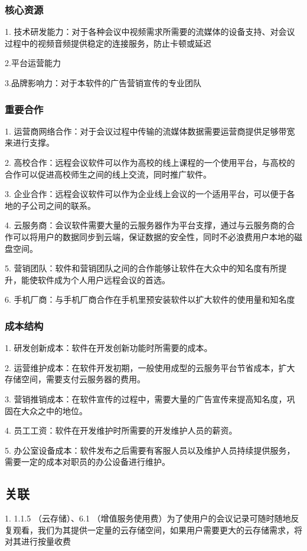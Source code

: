 \documentclass[a4paper,12pt]{article}
\begin{document}
    \subsubsection{核心资源}
    1. 技术研发能力：对于各种会议中视频需求所需要的流媒体的设备支持、对会议过程中的视频音频提供稳定的连接服务，防止卡顿或延迟

    2.平台运营能力

    3.品牌影响力：对于本软件的广告营销宣传的专业团队

    \subsubsection{重要合作}
    1. 运营商网络合作：对于会议过程中传输的流媒体数据需要运营商提供足够带宽来进行支撑。

    2. 高校合作：远程会议软件可以作为高校的线上课程的一个使用平台，与高校的合作可以促进高校师生之间的线上交流，同时推广软件。

    3. 企业合作：远程会议软件可以作为企业线上会议的一个适用平台，可以便于各地的子公司之间的联系。

    4. 云服务商：会议软件需要大量的云服务器作为平台支撑，通过与云服务商的合作可以将用户的数据同步到云端，保证数据的安全性，同时不必浪费用户本地的磁盘空间。

    5. 营销团队：软件和营销团队之间的合作能够让软件在大众中的知名度有所提升，能使软件成为个人用户远程会议的首选。

    6. 手机厂商：与手机厂商合作在手机里预安装软件以扩大软件的使用量和知名度
    \subsubsection{成本结构}
    1. 研发创新成本：软件在开发创新功能时所需要的成本。

    2. 运营维护成本：在软件开发初期，一般使用成型的云服务平台节省成本，扩大存储空间，需要支付云服务器的费用。

    3. 营销推销成本：在软件宣传的过程中，需要大量的广告宣传来提高知名度，巩固在大众之中的地位。

    4. 员工工资：软件在开发维护时所需要的开发维护人员的薪资。

    5. 办公室设备成本：软件发布之后需要有客服人员以及维护人员持续提供服务，需要一定的成本对职员的办公设备进行维护。

    \subsection{关联}
    1. 1.1.5 （云存储）、6.1 （增值服务使用费）为了使用户的会议记录可随时随地反复观看，我们为其提供一定量的云存储空间，如果用户需要更大的云存储需求，将对其进行按量收费
\end{document}
